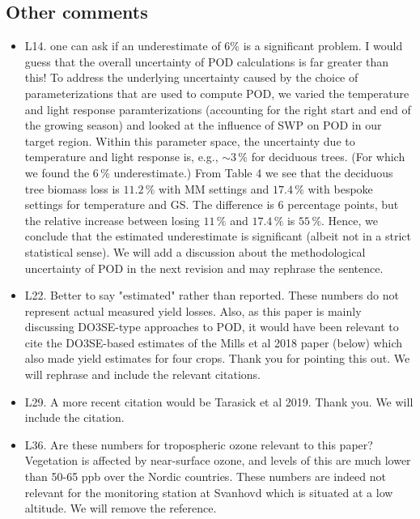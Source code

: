 \documentclass{scrartcl}
\begin{document}
\subsection*{Other comments} 
\begin{itemize}

\item {\color{blue}L14. one can ask if an underestimate of 6\% is a significant problem. I would guess that the overall uncertainty of POD calculations is far greater than this!}
To address the underlying uncertainty caused by the choice of parameterizations that are used to compute POD, we varied the temperature and light response paramterizations (accounting for the right start and end of the growing season) and looked at the influence of SWP on POD in our target region. Within this parameter space, the uncertainty due to temperature and light response is, e.g., $\sim3\,\%$ for deciduous trees. (For which we found the $6\,\%$ underestimate.)
From Table 4 we see that the deciduous tree biomass loss is $11.2\,\%$ with MM settings and $17.4\,\%$ with bespoke settings for temperature and GS. The difference is 6 percentage points, but the relative increase between losing $11\,\%$ and $17.4\,\%$ is $55\,\%$. Hence, we conclude that the estimated underestimate is significant (albeit not in a strict statistical sense). We will add a discussion about the methodological uncertainty of POD in the next revision and may rephrase the sentence.

\item {\color{blue}L22. Better to say "estimated" rather than reported. These numbers do not represent actual measured yield losses. Also, as this paper is mainly discussing DO3SE-type approaches to POD, it would have been relevant to cite the DO3SE-based estimates of the Mills et al 2018 paper (below) which also made yield estimates for four crops.}
Thank you for pointing this out. We will rephrase and include the relevant citations.

\item {\color{blue}L29. A more recent citation would be Tarasick et al 2019.}
Thank you. We will include the citation.

\item {\color{blue}L36. Are these numbers for tropospheric ozone relevant to this paper? Vegetation is affected by near-surface ozone, and levels of this are much lower than 50-65 ppb over the Nordic countries.}
These numbers are indeed not relevant for the monitoring station at Svanhovd which is situated at a low altitude. We will remove the reference.


\end{itemize}
\end{document}
